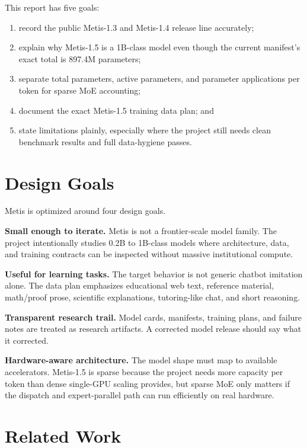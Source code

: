 \documentclass[11pt]{article}
\begin{document}
This report has five goals:

\begin{enumerate}
  \item record the public Metis-1.3 and Metis-1.4 release line accurately;
  \item explain why Metis-1.5 is a 1B-class model even though the current
  manifest's exact total is 897.4M parameters;
  \item separate total parameters, active parameters, and parameter applications
  per token for sparse MoE accounting;
  \item document the exact Metis-1.5 training data plan; and
  \item state limitations plainly, especially where the project still needs
  clean benchmark results and full data-hygiene passes.
\end{enumerate}

\section{Design Goals}

Metis is optimized around four design goals.

\textbf{Small enough to iterate.} Metis is not a frontier-scale model family.
The project intentionally studies 0.2B to 1B-class models where architecture,
data, and training contracts can be inspected without massive institutional
compute.

\textbf{Useful for learning tasks.} The target behavior is not generic chatbot
imitation alone. The data plan emphasizes educational web text, reference
material, math/proof prose, scientific explanations, tutoring-like chat, and
short reasoning.

\textbf{Transparent research trail.} Model cards, manifests, training plans,
and failure notes are treated as research artifacts. A corrected model release
should say what it corrected.

\textbf{Hardware-aware architecture.} The model shape must map to available
accelerators. Metis-1.5 is sparse because the project needs more capacity per
token than dense single-GPU scaling provides, but sparse MoE only matters if the
dispatch and expert-parallel path can run efficiently on real hardware.

\section{Related Work}
\end{document}
